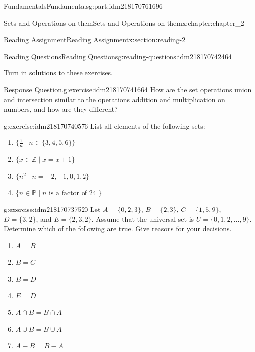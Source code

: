 \documentclass[oneside,10pt,]{book}
\numberwithin{equation}{section}
\begin{document}
\begin{partptx}{Fundamentals}{}{Fundamentals}{}{}{g:part:idm218170761696}
\begin{chapterptx}{Sets and Operations on them}{}{Sets and Operations on them}{}{}{x:chapter:chapter_2}
\begin{sectionptx}{Reading Assignment}{}{Reading Assignment}{}{}{x:section:reading-2}
%
%
\typeout{************************************************}
\typeout{************************************************}
%
\begin{reading-questions-subsection-numberless}{Reading Questions}{}{Reading Questions}{}{}{g:reading-questions:idm218170742464}
\begin{introduction}{}%
Turn in solutions to these exercises.%
\end{introduction}%
\begin{divisionexercise}{1}{Response Question.}{}{g:exercise:idm218170741664}%
How are the set operations union and intersection similar to the operations addition and multiplication on numbers, and how are they different?%
\end{divisionexercise}%
\begin{divisionexercise}{2}{}{}{g:exercise:idm218170740576}%
List all elements of the following sets:%
\begin{enumerate}[label=(\alph*)]
\item{}\(\displaystyle \{\frac{1}{n} \mid n \in \{3,4,5,6\}\}\)%
\item{}\(\displaystyle \{x \in \mathbb{Z} \mid x = x+1 \}\)%
\item{}\(\displaystyle \{n^2 \mid  n = -2, -1, 0, 1, 2\}\)%
\item{}\(\displaystyle \{n \in  \mathbb{P} \mid n \textrm{ is a  factor of  24 }\}\)%
\end{enumerate}
%
\end{divisionexercise}%
\begin{divisionexercise}{3}{}{}{g:exercise:idm218170737520}%
Let \(A = \{0, 2, 3\}\), \(B = \{2, 3\}\), \(C = \{1, 5, 9\}\), \(D = \{3, 2\}\), and \(E = \{2, 3, 2\}\). Assume that the universal set is \(U = \{0, 1, 2, . . . , 9\}\). Determine which of the following are true. Give reasons for your decisions.%
\begin{multicols}{2}
\begin{enumerate}[label=(\alph*)]
\item{}\(\displaystyle A = B\)%
\item{}\(\displaystyle B = C\)%
\item{}\(\displaystyle B = D\)%
\item{}\(\displaystyle E=D\)%
\item{}\(\displaystyle A\cap B = B\cap A\)%
\item{}\(\displaystyle A \cup  B = B \cup  A\)%
\item{}\(\displaystyle A-B = B-A\)%

\end{enumerate}
\end{multicols}
\end{divisionexercise}
\end{reading-questions-subsection-numberless}
\end{sectionptx}
\end{chapterptx}
\end{partptx}
\end{document}
